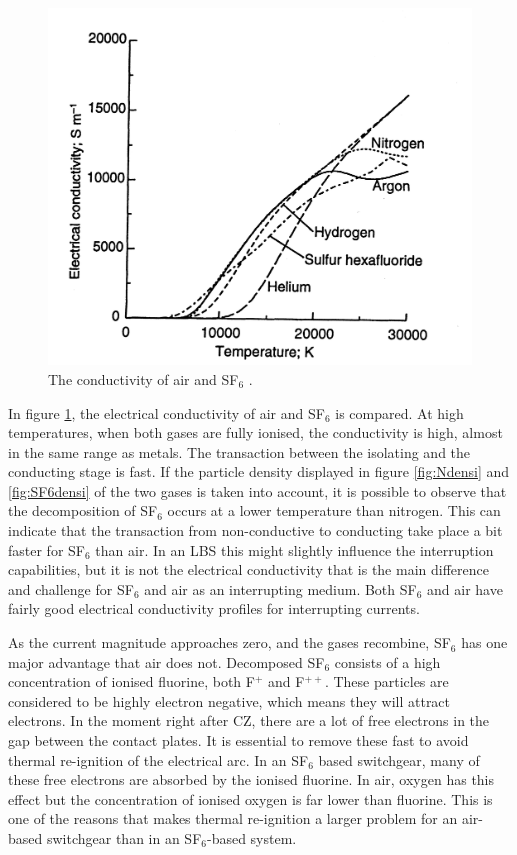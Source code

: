 \documentclass[10pt,a4paper,twoside]{article}
\begin{document}
\begin{figure}[H]
\centering
\includegraphics[scale=1]{Bilder/Discussion/conductSF6AndAIR.png}
\caption{The conductivity of air and SF${_6}$ \cite{bib:THFD}.} \label{fig:AirandSF6ConComp}
\end{figure}

In figure \ref{fig:AirandSF6ConComp}, the electrical conductivity of air and SF$_6$ is compared. At high temperatures, when both gases are fully ionised, the conductivity is high, almost in the same range as metals. The transaction between the isolating and the conducting stage is fast. If the particle density displayed in figure \ref{fig:Ndensi} and \ref{fig:SF6densi} of the two gases is taken into account, it is possible to observe that the decomposition of SF$_6$ occurs at a lower temperature than nitrogen. This can indicate that the transaction from non-conductive to conducting take place a bit faster for SF$_6$ than air. In an LBS this might slightly influence the interruption capabilities, but it is not the electrical conductivity that is the main difference and challenge for SF$_6$ and air as an interrupting medium. Both SF$_6$ and air have fairly good electrical conductivity profiles for interrupting currents.

As the current magnitude approaches zero, and the gases recombine, SF$_6$ has one major advantage that air does not. Decomposed SF$_6$ consists of a high concentration of ionised fluorine, both F$^{+}$ and F$^{++}$. These particles are considered to be highly electron negative, which means they will attract electrons. In the moment right after CZ, there are a lot of free electrons in the gap between the contact plates. It is essential to remove these fast to avoid thermal re-ignition of the electrical arc. In an SF$_6$ based switchgear, many of these free electrons are absorbed by the ionised fluorine. In air, oxygen has this effect but the concentration of ionised oxygen is far lower than fluorine. This is one of the reasons that makes thermal re-ignition a larger problem for an air-based switchgear than in an SF$_6$-based system.
\end{document}

